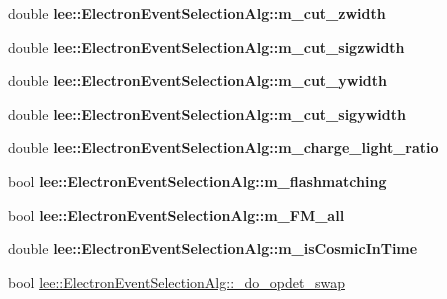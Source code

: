 \begin{DoxyCompactItemize}
\item 
\hypertarget{group__lee_gac32c1e1db8ad6287912fb1447ae7e192}{double {\bfseries lee\-::\-Electron\-Event\-Selection\-Alg\-::m\-\_\-cut\-\_\-zwidth}}\label{group__lee_gac32c1e1db8ad6287912fb1447ae7e192}

\item 
\hypertarget{group__lee_ga1bd6b33330d8666d823f3698cfa83785}{double {\bfseries lee\-::\-Electron\-Event\-Selection\-Alg\-::m\-\_\-cut\-\_\-sigzwidth}}\label{group__lee_ga1bd6b33330d8666d823f3698cfa83785}

\item 
\hypertarget{group__lee_ga2fca23cbb16ca60a2f593405f256f00e}{double {\bfseries lee\-::\-Electron\-Event\-Selection\-Alg\-::m\-\_\-cut\-\_\-ywidth}}\label{group__lee_ga2fca23cbb16ca60a2f593405f256f00e}

\item 
\hypertarget{group__lee_ga67bbf323c59354b2029f668c58a8951a}{double {\bfseries lee\-::\-Electron\-Event\-Selection\-Alg\-::m\-\_\-cut\-\_\-sigywidth}}\label{group__lee_ga67bbf323c59354b2029f668c58a8951a}

\item 
\hypertarget{group__lee_gabaeb4528a700866fdc0e362f540a8dea}{double {\bfseries lee\-::\-Electron\-Event\-Selection\-Alg\-::m\-\_\-charge\-\_\-light\-\_\-ratio}}\label{group__lee_gabaeb4528a700866fdc0e362f540a8dea}

\item 
\hypertarget{group__lee_gaaa06afa8044a10a6497852854a811a00}{bool {\bfseries lee\-::\-Electron\-Event\-Selection\-Alg\-::m\-\_\-flashmatching}}\label{group__lee_gaaa06afa8044a10a6497852854a811a00}

\item 
\hypertarget{group__lee_gabd632e59d98a72d8040890f425d1a3f2}{bool {\bfseries lee\-::\-Electron\-Event\-Selection\-Alg\-::m\-\_\-\-F\-M\-\_\-all}}\label{group__lee_gabd632e59d98a72d8040890f425d1a3f2}

\item 
\hypertarget{group__lee_ga2a8178edfca11d99f8ccbd86dbd1c3bd}{double {\bfseries lee\-::\-Electron\-Event\-Selection\-Alg\-::m\-\_\-is\-Cosmic\-In\-Time}}\label{group__lee_ga2a8178edfca11d99f8ccbd86dbd1c3bd}

\item 
\hypertarget{group__lee_gaf3cb19dac93bb287a5747ad4400c65ef}{bool \hyperlink{group__lee_gaf3cb19dac93bb287a5747ad4400c65ef}{lee\-::\-Electron\-Event\-Selection\-Alg\-::\-\_\-do\-\_\-opdet\-\_\-swap}}\label{group__lee_gaf3cb19dac93bb287a5747ad4400c65ef}


\end{DoxyCompactItemize}
